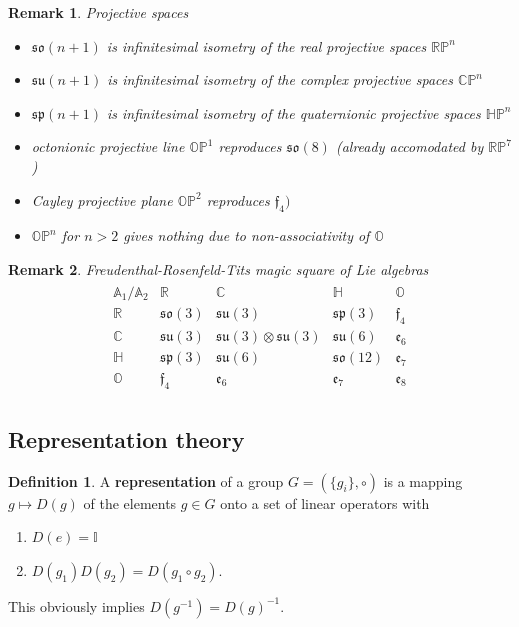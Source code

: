 \documentclass[10pt,a4paper]{book}
\newtheorem{remark}{Remark}[section]
\theoremstyle{definition}
\newtheorem{definition}{Definition}[section]
\begin{document}
\begin{remark}{}
Projective spaces
\begin{itemize}
    \item $\mathfrak{so}(n+1)$ is infinitesimal isometry of the real projective spaces $\mathbb{RP}^n$
    \item $\mathfrak{su}(n+1)$ is infinitesimal isometry of the complex projective spaces $\mathbb{CP}^n$
    \item $\mathfrak{sp}(n+1)$ is infinitesimal isometry of the quaternionic projective spaces $\mathbb{HP}^n$
    \item octonionic projective line $\mathbb{OP}^1$ reproduces $\mathfrak{so}(8)$ (already accomodated by $\mathbb{RP}^7$)
    \item Cayley projective plane $\mathbb{OP}^2$ reproduces $\mathfrak{f}_4)$
    \item $\mathbb{OP}^n$ for $n>2$ gives nothing due to non-associativity of $\mathbb{O}$
\end{itemize}
\end{remark}

\begin{remark}{}
Freudenthal-Rosenfeld-Tits magic square of Lie algebras
\begin{align}
\begin{array}{c||cccc}
\mathbb{A}_1/\mathbb{A}_2 & \mathbb{R} & \mathbb{C} & \mathbb{H} & \mathbb{O}\\ \hline\hline
\mathbb{R} & \mathfrak{so}(3) & \mathfrak{su}(3) & \mathfrak{sp}(3) & \mathfrak{f}_4 \\
\mathbb{C} & \mathfrak{su}(3) & \mathfrak{su}(3)\otimes\mathfrak{su}(3) & \mathfrak{su}(6) & \mathfrak{e}_6  \\
\mathbb{H} & \mathfrak{sp}(3) & \mathfrak{su}(6) & \mathfrak{so}(12) & \mathfrak{e}_7  \\
\mathbb{O} & \mathfrak{f}_4   & \mathfrak{e}_6 & \mathfrak{e}_7& \mathfrak{e}_8 
\end{array}
\end{align}
\end{remark}



\subsection{Representation theory}
\theoremstyle{definition}
\begin{definition}{}
A {\bf representation} of a group $G=\left(\{g_i\},\circ\right)$ is a mapping $g\mapsto D(g)$ of the elements $g\in G$ onto a set of linear operators with
\begin{enumerate}
    \item $D(e)=\mathbb{I}$
    \item $D(g_1)D(g_2) = D(g_1\circ g_2)$.
\end{enumerate}
This obviously implies $D(g^{-1})=D(g)^{-1}$.
\end{definition}
\end{document}
